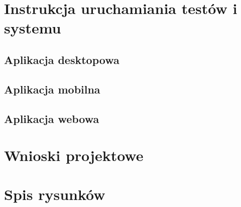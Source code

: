 \documentclass[12pt,a4paper]{article}
\begin{document}
	\section{Instrukcja uruchamiania testów i systemu}
		\subsection{Aplikacja desktopowa}
		\subsection{Aplikacja mobilna}
		\subsection{Aplikacja webowa}	 
	
	\newpage

	\section{Wnioski projektowe}
	\newpage

	\newpage	
	\section{Spis rysunków}
		\listoffigures
\end{document}
